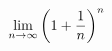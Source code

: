 \documentclass[preview]{standalone}
\begin{document}
\begin{align*}
\special{dvisvgm:raw <g id='unique000'>}\displaystyle\lim_{n\to\infty}\left(1+\frac{1}{n}\right)^n\special{dvisvgm:raw </g>}
\end{align*}
\end{document}
